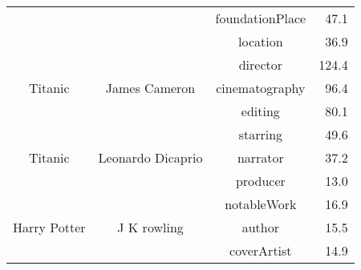 \begin{table}[!t]
\begin{tabular}{cccr}
    \multicolumn{1}{c}{} & \multicolumn{1}{c}{} & foundationPlace & 47.1 \\
    \multicolumn{1}{c}{} & \multicolumn{1}{c}{} & location & 36.9 \\
    \hline
    \multicolumn{1}{c}{\multirow{3}{*}{Titanic}} & \multicolumn{1}{c}{\multirow{3}[0]{*}{James Cameron}} & director & 124.4 \\
    \multicolumn{1}{c}{} & \multicolumn{1}{c}{} & cinematography & 96.4 \\
    \multicolumn{1}{c}{} & \multicolumn{1}{c}{} & editing & 80.1 \\
    \hline
    \multicolumn{1}{c}{\multirow{3}{*}{Titanic}} & \multicolumn{1}{c}{\multirow{3}[0]{*}{Leonardo Dicaprio}} & starring & 49.6 \\
    \multicolumn{1}{c}{} & \multicolumn{1}{c}{} & narrator & 37.2 \\
    \multicolumn{1}{c}{} & \multicolumn{1}{c}{} & producer & 13.0 \\
    \hline
    \multicolumn{1}{c}{\multirow{3}{*}{\parbox{1cm}{\centering \vspace{-1mm} Harry Potter}}} & \multicolumn{1}{c}{\multirow{3}[0]{*}{J K rowling}} & notableWork & 16.9 \\
    \multicolumn{1}{c}{} & \multicolumn{1}{c}{} & author & 15.5 \\
    \multicolumn{1}{c}{} & \multicolumn{1}{c}{} & coverArtist & 14.9 \\
    \bottomrule
    \end{tabular}%
  \label{tab:results}%
\vspace{-8mm}
\end{table}%


